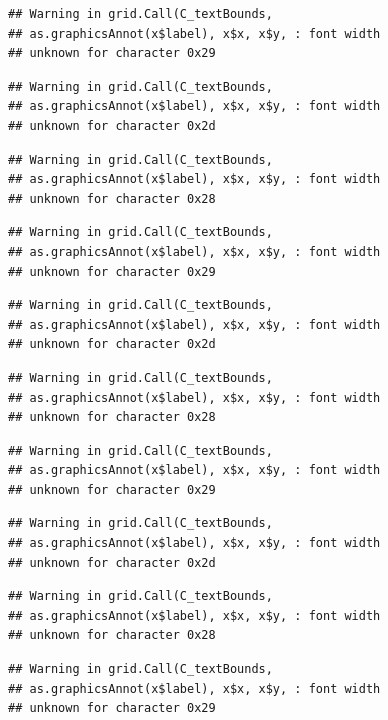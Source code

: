 \documentclass[
]{book}
\begin{document}
\begin{verbatim}
## Warning in grid.Call(C_textBounds,
## as.graphicsAnnot(x$label), x$x, x$y, : font width
## unknown for character 0x29
\end{verbatim}

\begin{verbatim}
## Warning in grid.Call(C_textBounds,
## as.graphicsAnnot(x$label), x$x, x$y, : font width
## unknown for character 0x2d
\end{verbatim}

\begin{verbatim}
## Warning in grid.Call(C_textBounds,
## as.graphicsAnnot(x$label), x$x, x$y, : font width
## unknown for character 0x28
\end{verbatim}

\begin{verbatim}
## Warning in grid.Call(C_textBounds,
## as.graphicsAnnot(x$label), x$x, x$y, : font width
## unknown for character 0x29
\end{verbatim}

\begin{verbatim}
## Warning in grid.Call(C_textBounds,
## as.graphicsAnnot(x$label), x$x, x$y, : font width
## unknown for character 0x2d
\end{verbatim}

\begin{verbatim}
## Warning in grid.Call(C_textBounds,
## as.graphicsAnnot(x$label), x$x, x$y, : font width
## unknown for character 0x28
\end{verbatim}

\begin{verbatim}
## Warning in grid.Call(C_textBounds,
## as.graphicsAnnot(x$label), x$x, x$y, : font width
## unknown for character 0x29
\end{verbatim}

\begin{verbatim}
## Warning in grid.Call(C_textBounds,
## as.graphicsAnnot(x$label), x$x, x$y, : font width
## unknown for character 0x2d
\end{verbatim}

\begin{verbatim}
## Warning in grid.Call(C_textBounds,
## as.graphicsAnnot(x$label), x$x, x$y, : font width
## unknown for character 0x28
\end{verbatim}

\begin{verbatim}
## Warning in grid.Call(C_textBounds,
## as.graphicsAnnot(x$label), x$x, x$y, : font width
## unknown for character 0x29
\end{verbatim}
\end{document}
